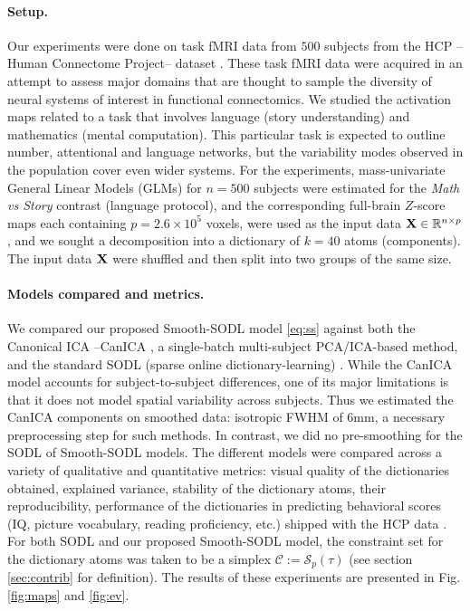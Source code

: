 \paragraph*{Setup.} Our experiments were done on task fMRI data from $500$ subjects
from the HCP --Human Connectome Project-- dataset
  \citep{VanEssen20122222}. These task fMRI data were acquired in an
attempt to assess major domains that are thought to sample the
diversity of neural systems of interest in functional connectomics.
We studied the activation maps related to a task that involves
language (story understanding) and mathematics (mental
computation). This particular task is expected to outline number, attentional and
language networks, but the variability modes observed in the
population cover even wider systems. For the experiments,
mass-univariate  General Linear Models (GLMs)   \citep{friston1995} for
$n=500$ subjects
were estimated for the \emph{Math vs Story} contrast (language
protocol), and the corresponding full-brain $Z$-score maps each
containing $p=2.6 \times 10^5$ voxels, were used as the input data $\mathbf{X} \in
\mathbb R^{n \times p}$,  and we
sought a decomposition into a dictionary of $k = 40$ atoms (components).
The input data $\mathbf{X}$ were shuffled and then split into two groups of the same
size.

\paragraph*{Models compared and metrics.} We compared our proposed Smooth-SODL model \eqref{eq:ss} against both the Canonical ICA --CanICA   \citep{varoquaux2010group}, a single-batch multi-subject PCA/ICA-based method, and the standard SODL (sparse online dictionary-learning)   \citep{mairal2010}. While the CanICA model accounts for subject-to-subject differences, one of
its major limitations is that it does not model spatial variability across
 subjects. Thus we estimated the CanICA components on smoothed data: isotropic FWHM of 6mm, a necessary preprocessing step for such methods. In contrast, we did no pre-smoothing for the SODL of Smooth-SODL models.
The different models were compared across a variety of qualitative and quantitative metrics: visual quality of the dictionaries obtained, explained variance, stability of the dictionary atoms, their reproducibility, performance of the dictionaries in predicting behavioral scores (IQ, picture vocabulary, reading proficiency, etc.) shipped with the HCP data   \citep{VanEssen20122222}. For both SODL  \citep{mairal2010} and our proposed Smooth-SODL model, the constraint set for the dictionary atoms was taken to be a simplex $\mathcal C := \mathcal S_p(\tau)$ (see section \ref{sec:contrib} for definition). The results of these experiments are presented in Fig. \ref{fig:maps}
and \ref{fig:ev}.

